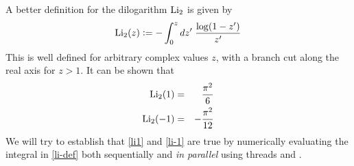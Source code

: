 \documentclass[12pt,answers]{exam}
\begin{document}
\pagestyle{headandfoot}
\runningfootrule
{}
\runningheader{}{}{}
\firstpagefooter{}{}{}



\def\Li{\mbox{\rm Li}_{2}}
\def\len{\mbox{\rm length}}
\def\dilog{\mbox{\tt dilog}}

A better definition for the dilogarithm $\Li$ is given by
%
\begin{equation}
\Li(z) \bydef
- \int_{0}^{z} dz' \; \frac{\log(1-z')}{z'} \label{eq:li-def}
\end{equation}
%
This is well defined for arbitrary complex values $z$, with a branch cut along the real axis
for $z > 1$. It can be shown that
%
\begin{eqnarray}
  \Li(1)  & = & \frac{\pi^{2}}{6} \label{eq:li1} \\
  \Li(-1) & = & - \frac{\pi^{2}}{12} \label{eq:li-1}
\end{eqnarray}
%
We will try to establish that \eqref{li1} and \eqref{li-1} are true by numerically evaluating
the integral in \eqref{li-def} both sequentially and {\em in parallel} using threads and \mpi.
%
\end{document}
